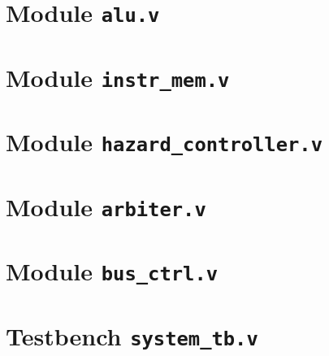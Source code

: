 \section{Module \texttt{alu.v}}


\section{Module \texttt{instr\_mem.v}}


\section{Module \texttt{hazard\_controller.v}}


\section{Module \texttt{arbiter.v}}


\section{Module \texttt{bus\_ctrl.v}}


\section{Testbench \texttt{system\_tb.v}}



